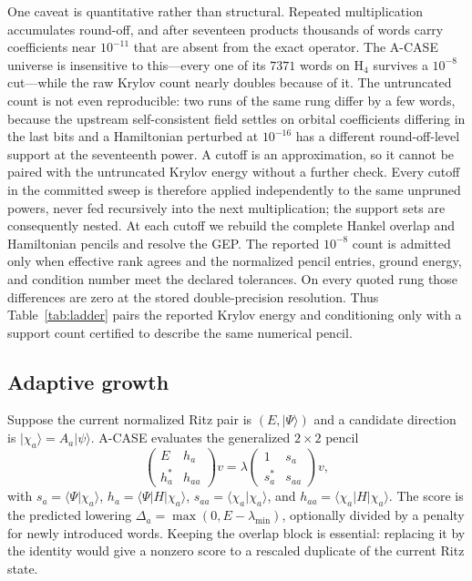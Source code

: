 \documentclass[aps,pra,reprint,superscriptaddress,nofootinbib,floatfix]{revtex4-2}
\newcommand{\ket}[1]{\lvert #1\rangle}
\begin{document}
One caveat is quantitative rather than structural.  Repeated multiplication
accumulates round-off, and after seventeen products thousands of words carry
coefficients near $10^{-11}$ that are absent from the exact operator.  The
A-CASE universe is insensitive to this---every one of its $7371$ words on
H$_4$ survives a $10^{-8}$ cut---while the raw Krylov count nearly doubles
because of it.  The untruncated count is not even reproducible: two runs of
the same rung differ by a few words, because the upstream self-consistent
field settles on orbital coefficients differing in the last bits and a
Hamiltonian perturbed at $10^{-16}$ has a different round-off-level support at
the seventeenth power.  A cutoff is an approximation, so it cannot be paired
with the untruncated Krylov energy without a further check.  Every cutoff in
the committed sweep is therefore applied independently to the same unpruned
powers, never fed recursively into the next multiplication; the support sets
are consequently nested.  At each cutoff we rebuild the complete Hankel
overlap and Hamiltonian pencils and resolve the GEP.  The reported $10^{-8}$
count is admitted only when effective rank agrees and the normalized pencil
entries, ground energy, and condition number meet the declared tolerances.
On every quoted rung those differences are zero at the stored
double-precision resolution.  Thus Table~\ref{tab:ladder} pairs the reported
Krylov energy and conditioning only with a support count certified to describe
the same numerical pencil.

\subsection{Adaptive growth}
\label{sec:growth}

Suppose the current normalized Ritz pair is $(E,\ket{\Psi})$ and a candidate
direction is $\ket{\chi_a}=A_a\ket{\psi}$.  A-CASE evaluates the generalized
$2\times2$ pencil
\begin{equation}
 \begin{pmatrix}E&h_a\\h_a^*&h_{aa}\end{pmatrix}v
 =\lambda
 \begin{pmatrix}1&s_a\\s_a^*&s_{aa}\end{pmatrix}v,
 \label{eq:two-by-two}
\end{equation}
with $s_a=\langle\Psi|\chi_a\rangle$,
$h_a=\langle\Psi|H|\chi_a\rangle$,
$s_{aa}=\langle\chi_a|\chi_a\rangle$, and
$h_{aa}=\langle\chi_a|H|\chi_a\rangle$.  The score is the predicted lowering
$\Delta_a=\max(0,E-\lambda_{\min})$, optionally divided by a penalty for newly
introduced words.  Keeping the overlap block is essential: replacing it by
the identity would give a nonzero score to a rescaled duplicate of the
current Ritz state.
\end{document}
